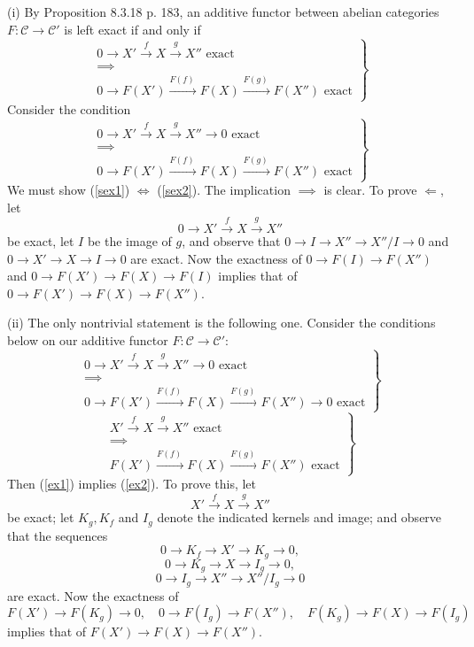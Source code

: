 \documentclass[12pt]{article}
\theoremstyle{remark}
\newcommand{\C}{\mathcal C}
\begin{document}
(i) By Proposition 8.3.18 p. 183, an additive functor between abelian categories $F:\C\to\C'$ is left exact if and only if 
\begin{equation}\label{sex1}
\left.
\begin{matrix}
0\to X'\overset{f}{\to}X\overset{g}{\to}X''\text{ exact }\\ 
\implies\\ 
0\to F(X')\overset{F(f)\ }{\longrightarrow}F(X)\overset{F(g)\ }{\longrightarrow}F(X'')\text{ exact}
\end{matrix}
\right\}
\end{equation} 
Consider the condition 
\begin{equation}\label{sex2}
\left.
\begin{matrix}
0\to X'\overset{f}{\to}X\overset{g}{\to}X''\to0\text{ exact }\\ 
\implies\\ 
0\to F(X')\overset{F(f)\ }{\longrightarrow}F(X)\overset{F(g)\ }{\longrightarrow}F(X'')\text{ exact}
\end{matrix}
\right\}
\end{equation}
We must show (\ref{sex1}) $\iff$ (\ref{sex2}). The implication $\implies$ is clear. To prove $\Longleftarrow$, let 
$$
0\to X'\overset{f}{\to}X\overset{g}{\to}X''
$$
be exact, let $I$ be the image of $g$, and observe that $0\to I\to X''\to X''/I\to0$ and $0\to X'\to X\to I\to0$ are exact. Now the exactness of $0\to F(I)\to F(X'')$ and $0\to F(X')\to F(X)\to F(I)$ implies that of $0\to F(X')\to F(X)\to F(X'')$. 

(ii) The only nontrivial statement is the following one. Consider the conditions below on our additive functor $F:\C\to\C'$: 
\begin{equation}\label{ex1}
\left.
\begin{matrix}
0\to X'\overset{f}{\to}X\overset{g}{\to}X''\to0\text{ exact }\\ 
\implies\\ 
0\to F(X')\overset{F(f)\ }{\longrightarrow}F(X)\overset{F(g)\ }{\longrightarrow}F(X'')\to0\text{ exact}
\end{matrix}
\right\}
\end{equation}  
\begin{equation}\label{ex2}
\left.
\begin{matrix}
X'\overset{f}{\to}X\overset{g}{\to}X''\text{ exact }\\ 
\implies\\ 
F(X')\overset{F(f)\ }{\longrightarrow}F(X)\overset{F(g)\ }{\longrightarrow}F(X'')\text{ exact}
\end{matrix}
\right\}
\end{equation} 
Then (\ref{ex1}) implies (\ref{ex2}). To prove this, let 
$$
X'\overset{f}{\to}X\overset{g}{\to}X''
$$
be exact; let $K_g,K_f$ and $I_g$ denote the indicated kernels and image; and observe that the sequences 
$$
0\to K_f\to X'\to K_g\to 0,
$$
$$
0\to K_g\to X\to I_g\to 0,
$$
$$
0\to I_g\to X''\to X''/I_g\to 0
$$
are exact. Now the exactness of 
$$
F(X')\to F(K_g)\to0,\quad 0\to F(I_g)\to F(X''),\quad F(K_g)\to F(X)\to F(I_g)
$$
implies that of $F(X')\to F(X)\to F(X'')$. 
%
\end{document}
